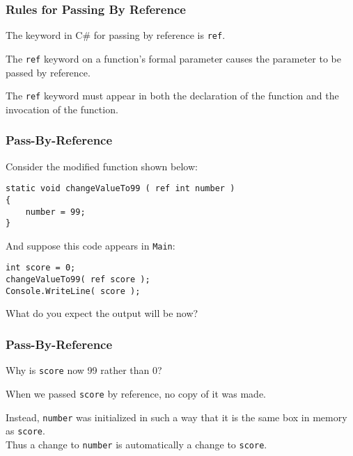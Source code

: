 \begin{frame}
\frametitle{Rules for Passing By Reference}

The keyword in C\# for passing by reference is \alert{\texttt{ref}}.

The \texttt{ref} keyword on a function's formal parameter causes the parameter to be passed by reference.


The \texttt{ref} keyword must appear in both the declaration of the function and the invocation of the function.


\end{frame}

\begin{frame}[fragile]
\frametitle{Pass-By-Reference}
Consider the modified function shown below:

\begin{verbatim}
static void changeValueTo99 ( ref int number )
{
    number = 99;
}
\end{verbatim}

And suppose this code appears in \texttt{Main}:
\begin{verbatim}
int score = 0;
changeValueTo99( ref score );
Console.WriteLine( score );
\end{verbatim}

What do you expect the output will be now?

\end{frame}

\begin{frame}
\frametitle{Pass-By-Reference}

Why is \texttt{score} now 99 rather than 0?

When we passed \texttt{score} by reference, no copy of it was made. 

Instead, \texttt{number} was initialized in such a way that it is the same box in memory as \texttt{score}.\\
\quad Thus a change to \texttt{number} is automatically a change to \texttt{score}.

\end{frame}

